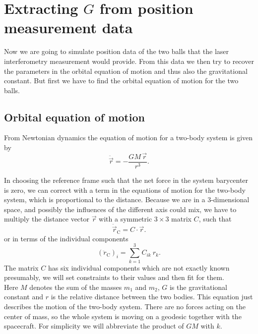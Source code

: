 \documentclass[prb,preprint]{revtex4-1}
\begin{document}
\section{Extracting $G$ from position measurement data}

Now we are going to simulate position data of the two balls that the laser interferometry measurement would provide. From this data we then try to recover the parameters in the orbital equation of motion and thus also the gravitational constant. But first we have to find the orbital equation of motion for the two balls.\\

\subsection{Orbital equation of motion}
From Newtonian dynamics the equation of motion for a two-body system is given by 
\begin{equation}
\label{eq:eomeasy}
\ddot{\vec{r}} = - \frac{G M\, \vec{r}}{r^3}.
\end{equation}


In choosing the reference frame such that the net force in the system barycenter is zero, we can correct with a term in the equations of motion for the two-body system, which is proportional to the distance. Because we are in a 3-dimensional space, and possibly the influences of the different axis could mix, we have to multiply the distance vector $\vec{r}$ with a symmetric $3 \times 3$ matrix $C$, such that  
\begin{equation}
\label{eq:tidal}
\ddot{\vec{r}}_{\mathrm{C}} = C \cdot \vec{r}.
\end{equation}
or in terms of the individual components 
\begin{equation}
\label{eq:tidacom}
\left(\ddot{r}_\mathrm{C}\right)_i = \sum_{k=1}^{3} C_{ik} \: r_k.
\end{equation}
The matrix $C$ has six individual components which are not exactly known presumably, we will set constraints to their values and then fit for them. \\
Here $M$ denotes the sum of the masses $m_1$ and $m_2$, $G$ is the gravitational constant and $r$ is the relative distance between the two bodies. This equation just describes the motion of the two-body system. There are no forces acting on the center of mass, so the whole system is moving on a geodesic together with the spacecraft. For simplicity we will abbreviate the product of $GM$ with $k$.\\
\end{document}
